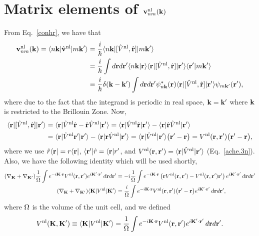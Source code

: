 \section{Matrix elements of 
\texorpdfstring{$\bfv^\nl_{nm}(\bfk)$}{Vnonlocal}}\label{appvnl}
From Eq.~\eqref{conhr}, we have that
\begin{align}\label{vnln.0}
\bfv^\nl_{nm}(\bfk)=\bra{n\bfk}\hat\bfv^\nl\ket{m\bfk'}
&=
\frac{i}{\hbar}
\bra{n\bfk}[\hat V^\nl,\hat\bfr]\ket{m\bfk'}
\nonumber\\
&=
\frac{i}{\hbar}
\int d\bfr d\bfr'
\braket{n\bfk}{\bfr}
\bra{\bfr}
[\hat V^\nl,\hat \bfr]
\ket{\bfr'}
\braket{\bfr'}{m\bfk'}
\nonumber\\
&=
\frac{i}{\hbar}
\gd(\bfk-\bfk')
\int d\bfr d\bfr'
\psi^*_{n\bfk}(\bfr)
\bra{\bfr}
[\hat V^\nl,\hat \bfr]
\ket{\bfr'}
\psi_{m\bfk'}(\bfr')
,
\end{align}   
where due to the fact that the integrand is periodic in real space,
$\bfk=\bfk'$ where $\bfk$ is restricted to the Brillouin Zone.
Now,
\begin{align}\label{vnln.1}
\bra{\bfr}
[\hat V^\nl,\hat \bfr]
\ket{\bfr'}
&=
\bra{\bfr}
\hat V^\nl\hat \bfr
-
\hat \bfr\hat V^\nl
\ket{\bfr'}
=
\bra{\bfr}
\hat V^\nl\hat \bfr
\ket{\bfr'}
-
\bra{\bfr}
\hat \bfr\hat V^\nl
\ket{\bfr'}
\nonumber\\
&=
\bra{\bfr}
\hat V^\nl \bfr'
\ket{\bfr'}
-
\bra{\bfr}
\bfr\hat V^\nl
\ket{\bfr'}
=
\bra{\bfr}
\hat V^\nl
\ket{\bfr'}
\big(\bfr'-\bfr\big)
=V^\nl(\bfr,\bfr') \big(\bfr'-\bfr\big)
,
\end{align}
where we use 
$\hat r \bra{\bfr}=r \bra{\bfr}$,
$\bra{\bfr'}\hat r=\bra{\bfr}r'$,
and $V^\nl(\bfr,\bfr')=\bra{\bfr}\hat V^\nl\ket{\bfr'}$ (Eq.~\eqref{ache.3n}).
Also, we have the following identity which will be used shortly, 
\begin{align}\label{cn51}
(\nabla_\bfK+\nabla_{\bfK'})
\frac{1}{\gO}
\int e^{-i\bfK\cdot\bfr}
V^\nl(\bfr,\bfr')
e^{i\bfK'\cdot\bfr'}
\,d\bfr d\bfr'
&=
-i
\frac{1}{\gO}
\int e^{-i\bfK\cdot\bfr}
\left(
\bfr
V^\nl(\bfr,\bfr')
-
V^\nl(\bfr,\bfr')
\bfr'
\right)
e^{i\bfK'\cdot\bfr'}
\,d\bfr d\bfr'
\nonumber\\
(\nabla_\bfK+\nabla_{\bfK'})
\bra{\bfK}
V^\nl
\ket{\bfK'}
&=
\frac{i}{\gO}
\int e^{-i\bfK\cdot\bfr}
V^\nl(\bfr,\bfr')
\big(
\bfr'
-
\bfr
\big)
e^{i\bfK'\cdot\bfr'}
\,d\bfr d\bfr'
,
\end{align}
where $\gO$ is the volume of the unit cell,  
and we defined
\begin{align}\label{cn52}
V^\nl(\bfK,\bfK')\equiv
\bra{\bfK}
V^\nl
\ket{\bfK'}
=
\frac{1}{\gO}
\int e^{-i\bfK\cdot\bfr}
V^\nl(\bfr,\bfr')
e^{i\bfK'\cdot\bfr'}
\,d\bfr d\bfr'
.
\end{align}
